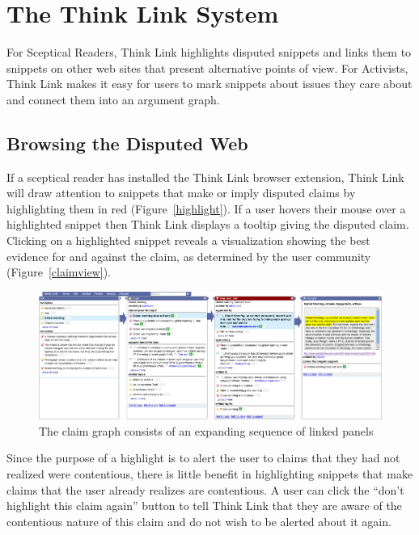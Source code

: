 \documentclass{chi2009}
\begin{document}
\section{The Think Link System}

For Sceptical Readers, Think Link highlights disputed snippets and links them to snippets on other web sites that present alternative points of view. For Activists, Think Link makes it easy for users to mark snippets about issues they care about and connect them into an argument graph.

\subsection{Browsing the Disputed Web}

If a sceptical reader has installed the Think Link browser extension, Think Link will draw attention to snippets that make or imply disputed claims by highlighting them in red (Figure~\ref{highlight}). If a user hovers their mouse over a highlighted snippet then Think Link displays a tooltip giving the disputed claim. Clicking on a highlighted snippet reveals a visualization showing the best evidence for and against the claim, as determined by the user community (Figure~\ref{claimview}).

\begin{figure}[tb]
	\begin{center}
	\includegraphics[width=18cm]{../screenshots/v2_panels2.png}
	\caption{The claim graph consists of an expanding sequence of linked panels}
	\label{panels}
	\end{center}
\end{figure}

Since the purpose of a highlight is to alert the user to claims that they had not realized were contentious, there is little benefit in highlighting snippets that make claims that the user already realizes are contentious. A user can click the ``don't highlight this claim again'' button to tell Think Link that they are aware of the contentious nature of this claim and do not wish to be alerted about it again.
\end{document}

